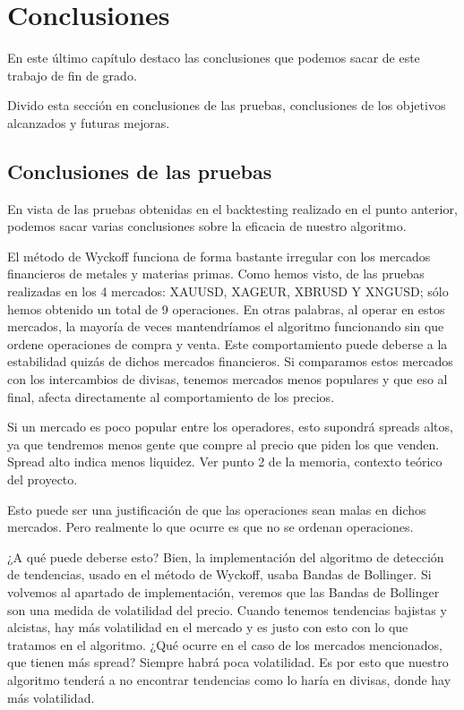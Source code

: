 

\chapter{Conclusiones}

En este último capítulo destaco las conclusiones que podemos sacar de este trabajo de fin de grado.\newline

Divido esta sección en conclusiones de las pruebas, conclusiones de los objetivos alcanzados y futuras mejoras.\newline


\section{Conclusiones de las pruebas}

En vista de las pruebas obtenidas en el backtesting realizado en el punto anterior, podemos sacar varias conclusiones sobre la eficacia de nuestro algoritmo.\newline

El método de Wyckoff funciona de forma bastante irregular con los mercados financieros de metales y materias primas. Como hemos visto, de las pruebas realizadas en los 4 mercados: XAUUSD, XAGEUR, XBRUSD Y XNGUSD; sólo hemos obtenido un total de 9 operaciones. En otras palabras, al operar en estos mercados, la mayoría de veces mantendríamos el algoritmo funcionando sin que ordene operaciones de compra y venta. Este comportamiento puede deberse a la estabilidad quizás de dichos mercados financieros. Si comparamos estos mercados con los intercambios de divisas, tenemos mercados menos populares y que eso al final, afecta directamente al comportamiento de los precios. \newline

Si un mercado es poco popular entre los operadores, esto supondrá spreads altos, ya que tendremos menos gente que compre al precio que piden los que venden. Spread alto indica menos liquidez. Ver punto 2 de la memoria, contexto teórico del proyecto. \newline

Esto puede ser una justificación de que las operaciones sean malas en dichos mercados. Pero realmente lo que ocurre es que no se ordenan operaciones. \newline

¿A qué puede deberse esto? Bien, la implementación del algoritmo de detección de tendencias, usado en el método de Wyckoff, usaba Bandas de Bollinger. Si volvemos al apartado de implementación, veremos que las Bandas de Bollinger son una medida de volatilidad del precio. Cuando tenemos tendencias bajistas y alcistas, hay más volatilidad en el mercado y es justo con esto con lo que tratamos en el algoritmo. ¿Qué ocurre en el caso de los mercados mencionados, que tienen más spread? Siempre habrá poca volatilidad. Es por esto que nuestro algoritmo tenderá a no encontrar tendencias como lo haría en divisas, donde hay más volatilidad.\newline


